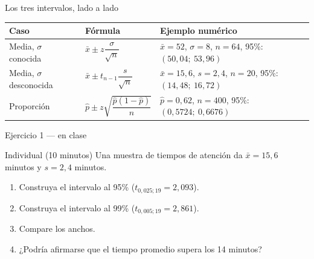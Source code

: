 \documentclass[aspectratio=169,10pt]{beamer}
\begin{document}
\begin{frame}{Los tres intervalos, lado a lado}
  \footnotesize
  \begin{center}
  \begin{tabular}{@{}p{2.8cm}p{4.0cm}p{4.4cm}@{}}
    \toprule
    \textbf{Caso} & \textbf{Fórmula} & \textbf{Ejemplo numérico} \\
    \midrule
    Media, $\sigma$ conocida &
      $\bar{x}\pm z\dfrac{\sigma}{\sqrt{n}}$ &
      $\bar x=52$, $\sigma=8$, $n=64$, 95\%: \newline
      $(50{,}04;\ 53{,}96)$ \\
    \addlinespace
    Media, $\sigma$ desconocida &
      $\bar{x}\pm t_{n-1}\dfrac{s}{\sqrt{n}}$ &
      $\bar x=15{,}6$, $s=2{,}4$, $n=20$, 95\%: \newline
      $(14{,}48;\ 16{,}72)$ \\
    \addlinespace
    Proporción &
      $\hat{p}\pm z\sqrt{\dfrac{\hat p(1-\hat p)}{n}}$ &
      $\hat p=0{,}62$, $n=400$, 95\%: \newline
      $(0{,}5724;\ 0{,}6676)$ \\
    \bottomrule
  \end{tabular}
  \end{center}
\end{frame}

\begin{frame}{Ejercicio 1 — en clase}
  \begin{alertblock}{Individual (10 minutos)}
    Una muestra de  tiempos de atención da
    $\bar{x}=15{,}6$ minutos y $s=2{,}4$ minutos.

    \vspace{0.25cm}
    \begin{enumerate}
      \item Construya el intervalo al 95\% ($t_{0{,}025;19}=2{,}093$).
      \item Construya el intervalo al 99\% ($t_{0{,}005;19}=2{,}861$).
      \item Compare los anchos.
      \item ¿Podría afirmarse que el tiempo promedio supera los 14 minutos?
    \end{enumerate}
  \end{alertblock}
\end{frame}
\end{document}
